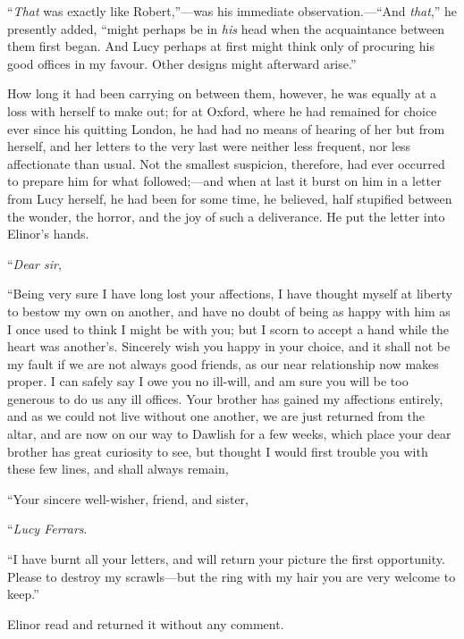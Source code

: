 \documentclass{article}
\begin{document}
``\emph{That} was exactly like Robert,''---was his immediate
observation.---``And \emph{that},'' he presently added, ``might
perhaps be in \emph{his} head when the acquaintance between
them first began.  And Lucy perhaps at first might
think only of procuring his good offices in my favour.
Other designs might afterward arise.''

How long it had been carrying on between them,
however, he was equally at a loss with herself to make out;
for at Oxford, where he had remained for choice ever since
his quitting London, he had had no means of hearing of her
but from herself, and her letters to the very last were
neither less frequent, nor less affectionate than usual.
Not the smallest suspicion, therefore, had ever occurred
to prepare him for what followed;---and when at last it
burst on him in a letter from Lucy herself, he had been
for some time, he believed, half stupified between
the wonder, the horror, and the joy of such a deliverance.
He put the letter into Elinor's hands.

\bigskip
     ``\emph{Dear sir},
\medskip

     ``Being very sure I have long lost your affections,
     I have thought myself at liberty to bestow my own
     on another, and have no doubt of being as happy with
     him as I once used to think I might be with you;
     but I scorn to accept a hand while the heart was
     another's.  Sincerely wish you happy in your choice,
     and it shall not be my fault if we are not always
     good friends, as our near relationship now makes
     proper.  I can safely say I owe you no ill-will,
     and am sure you will be too generous to do us any
     ill offices.  Your brother has gained my affections
     entirely, and as we could not live without one
     another, we are just returned from the altar, and
     are now on our way to Dawlish for a few weeks, which
     place your dear brother has great curiosity to see,
     but thought I would first trouble you with these
     few lines, and shall always remain,

\medskip
     ``Your sincere well-wisher, friend, and sister,

\medskip
                                        ``\emph{Lucy Ferrars}.

\medskip
     ``I have burnt all your letters, and will return
     your picture the first opportunity.  Please to destroy
     my scrawls---but the ring with my hair you are very
     welcome to keep.''
\bigskip

Elinor read and returned it without any comment.
\end{document}
